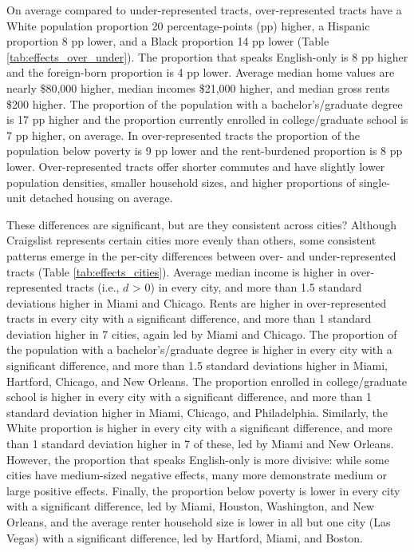 \documentclass[11pt,letterpaper]{article}
\begin{document}
On average compared to under-represented tracts, over-represented tracts have a White population proportion 20 percentage-points (pp) higher, a Hispanic proportion 8 pp lower, and a Black proportion 14 pp lower (Table \ref{tab:effects_over_under}). The proportion that speaks English-only is 8 pp higher and the foreign-born proportion is 4 pp lower. Average median home values are nearly \$80,000 higher, median incomes \$21,000 higher, and median gross rents \$200 higher. The proportion of the population with a bachelor's/graduate degree is 17 pp higher and the proportion currently enrolled in college/graduate school is 7 pp higher, on average. In over-represented tracts the proportion of the population below poverty is 9 pp lower and the rent-burdened proportion is 8 pp lower. Over-represented tracts offer shorter commutes and have slightly lower population densities, smaller household sizes, and higher proportions of single-unit detached housing on average.

These differences are significant, but are they consistent across cities? Although Craigslist represents certain cities more evenly than others, some consistent patterns emerge in the per-city differences between over- and under-represented tracts (Table \ref{tab:effects_cities}). Average median income is higher in over-represented tracts (i.e., $d$ > 0) in every city, and more than 1.5 standard deviations higher in Miami and Chicago. Rents are higher in over-represented tracts in every city with a significant difference, and more than 1 standard deviation higher in 7 cities, again led by Miami and Chicago. The proportion of the population with a bachelor's/graduate degree is higher in every city with a significant difference, and more than 1.5 standard deviations higher in Miami, Hartford, Chicago, and New Orleans. The proportion enrolled in college/graduate school is higher in every city with a significant difference, and more than 1 standard deviation higher in Miami, Chicago, and Philadelphia. Similarly, the White proportion is higher in every city with a significant difference, and more than 1 standard deviation higher in 7 of these, led by Miami and New Orleans. However, the proportion that speaks English-only is more divisive: while some cities have medium-sized negative effects, many more demonstrate medium or large positive effects. Finally, the proportion below poverty is lower in every city with a significant difference, led by Miami, Houston, Washington, and New Orleans, and the average renter household size is lower in all but one city (Las Vegas) with a significant difference, led by Hartford, Miami, and Boston.
\end{document}

